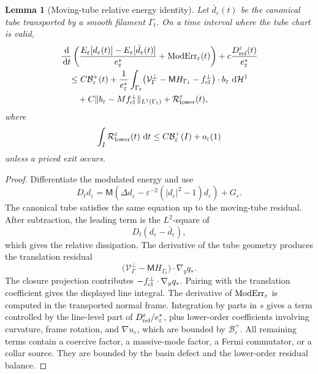 \documentclass[11pt]{article}
\newtheorem{lemma}[theorem]{Lemma}
\theoremstyle{definition}
\newcommand{\dd}{\,\mathrm d}
\newcommand{\eps}{\varepsilon}
\newcommand{\estar}{e_\varepsilon^\ast}
\newcommand{\Basin}{\mathcal B}
\newcommand{\Mmob}{\mathsf M}
\newcommand{\Vrel}{\mathcal V}
\newcommand{\Hh}{\mathcal H}
\begin{document}
\begin{lemma}[Moving-tube relative energy identity]
\label{lem:short-moving-energy}
Let \(\bar d_\eps(t)\) be the canonical tube transported by a smooth filament
\(\Gamma_t\).  On a time interval where the tube chart is valid,
\[
\begin{aligned}
&\frac{\dd}{\dd t}
        \left(
        \frac{E_\eps[d_\eps(t)]-E_\eps[\bar d_\eps(t)]}{\estar}
        +
        {\rm ModErr}_\eps(t)
        \right)
        +
        c\frac{D_{\rm rel}^\eps(t)}{\estar}
\\
&\quad\le
        C\Basin_\eps^+(t)
        +
        \frac{1}{\estar}
        \int_{\Gamma_t}
        \bigl(\Vrel_\Gamma^\perp-\Mmob H_{\Gamma_t}-f_{\rm cl}^\perp\bigr)
        \cdot b_\eps\,\dd\Hh^1
\\
&\qquad+
        C\|b_\eps-Mf_{\rm cl}^\perp\|_{L^1(\Gamma_t)}
        +
        \mathcal R_{\rm lower}^\eps(t),
\end{aligned}
\]
where
\[
        \int_I\mathcal R_{\rm lower}^\eps(t)\,\dd t
        \le
        C\Basin_\eps^+(I)+o_\eps(1)
\]
unless a priced exit occurs.
\end{lemma}

\begin{proof}
Differentiate the modulated energy and use
\[
        D_td_\eps
        =
        \Mmob\left(\Delta d_\eps
        -\eps^{-2}(|d_\eps|^2-1)d_\eps\right)
        +
        G_\eps .
\]
The canonical tube satisfies the same equation up to the moving-tube residual.
After subtraction, the leading term is the \(L^2\)-square of
\[
        D_t(d_\eps-\bar d_\eps),
\]
which gives the relative dissipation.  The derivative of the tube geometry
produces the translation residual
\[
        \bigl(\Vrel_\Gamma^\perp-\Mmob H_{\Gamma_t}\bigr)\cdot\nabla_y q_\ast .
\]
The closure projection contributes \(-f_{\rm cl}^\perp\cdot\nabla_y q_\ast\).
Pairing with the translation coefficient gives the displayed line integral.
The derivative of \({\rm ModErr}_\eps\) is computed in the transported normal
frame.  Integration by parts in \(s\) gives a term controlled by the line-level
part of \(D_{\rm rel}^\eps/\estar\), plus lower-order coefficients involving
curvature, frame rotation, and \(\nabla u_\eps\), which are bounded by
\(\Basin_\eps^+\).  All remaining terms contain a coercive factor, a
massive-mode factor, a Fermi commutator, or a collar source.  They are bounded
by the basin defect and the lower-order residual balance.
\end{proof}
\end{document}
